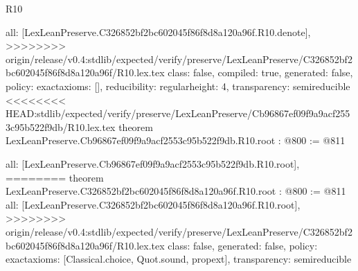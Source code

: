 \begin{lexlean}{R10}
\begin{coremodule}
{{{{{{{{{  all: [LexLeanPreserve.C326852bf2bc602045f86f8d8a120a96f.R10.denote],
>>>>>>>> origin/release/v0.4:stdlib/expected/verify/preserve/LexLeanPreserve/C326852bf2bc602045f86f8d8a120a96f/R10.lex.tex
  class: false,
  compiled: true,
  generated: false,
  policy: exact{axioms: []},
  reducibility: regular{height: 4},
  transparency: semireducible
}
<<<<<<<< HEAD:stdlib/expected/verify/preserve/LexLeanPreserve/Cb96867ef09f9a9acf2553c95b522f9db/R10.lex.tex
theorem LexLeanPreserve.Cb96867ef09f9a9acf2553c95b522f9db.R10.root : @800 := @811 {
  all: [LexLeanPreserve.Cb96867ef09f9a9acf2553c95b522f9db.R10.root],
========
theorem LexLeanPreserve.C326852bf2bc602045f86f8d8a120a96f.R10.root : @800 := @811 {
  all: [LexLeanPreserve.C326852bf2bc602045f86f8d8a120a96f.R10.root],
>>>>>>>> origin/release/v0.4:stdlib/expected/verify/preserve/LexLeanPreserve/C326852bf2bc602045f86f8d8a120a96f/R10.lex.tex
  class: false,
  generated: false,
  policy: exact{axioms: [Classical.choice, Quot.sound, propext]},
  transparency: semireducible
}

}}}}}}}}}
\end{coremodule}
\end{lexlean}
